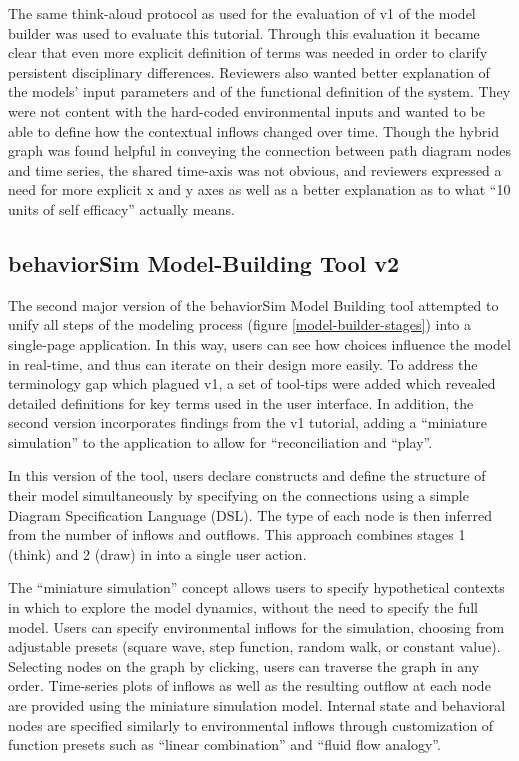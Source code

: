 \documentclass[conference]{IEEEtran}
\begin{document}
The same think-aloud protocol as used for the evaluation of v1 of the model builder was used to evaluate this tutorial. 
Through this evaluation it became clear that even more explicit definition of terms was needed in order to clarify persistent disciplinary differences.
Reviewers also wanted better explanation of the models' input parameters and of the functional definition of the system.
They were not content with the hard-coded environmental inputs and wanted to be able to define how the contextual inflows changed over time.
Though the hybrid graph was found helpful in conveying the connection between path diagram nodes and time series, the shared time-axis was not obvious, and reviewers expressed a need for more explicit x and y axes as well as a better explanation as to what ``10 units of self efficacy'' actually means.

\subsection{behaviorSim Model-Building Tool v2}
The second major version of the behaviorSim Model Building tool attempted to unify all steps of the modeling process (figure \ref{model-builder-stages}) into a single-page application.
In this way, users can see how choices influence the model in real-time, and thus can iterate on their design more easily.
To address the terminology gap which plagued v1, a set of tool-tips were added which revealed detailed definitions for key terms used in the user interface.
In addition, the second version incorporates findings from the v1 tutorial, adding a ``miniature simulation'' to the application to allow for ``reconciliation and ``play''.

In this version of the tool, users declare constructs and define the structure of their model simultaneously by specifying on the connections using a simple Diagram Specification Language (DSL). 
The type of each node is then inferred from the number of inflows and outflows.
This approach combines stages 1 (think) and 2 (draw) in into a single user action.

The ``miniature simulation'' concept allows users to specify hypothetical contexts in which to explore the model dynamics, without the need to specify the full model.
Users can specify environmental inflows for the simulation, choosing from adjustable presets (square wave, step function, random walk, or constant value).
Selecting nodes on the graph by clicking, users can traverse the graph in any order.
Time-series plots of inflows as well as the resulting outflow at each node are provided using the miniature simulation model.
Internal state and behavioral nodes are specified similarly to environmental inflows through customization of function presets such as ``linear combination'' and ``fluid flow analogy''\cite{martin2014dynamical}.
\end{document}
